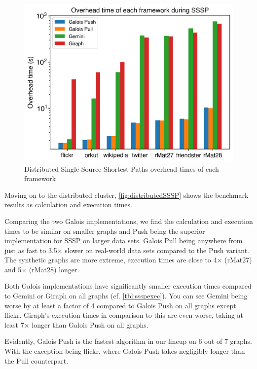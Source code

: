 \begin{figure}
	\centering
	\includegraphics[width=\linewidth]{../../plots/distributedSSSP_overheadTime.png}
	\caption{Distributed Single-Source Shortest-Paths overhead times of each framework}
	\label{fig:distributedSSSP_overhead}
\end{figure}

Moving on to the distributed cluster, \autoref{fig:distributedSSSP} shows the benchmark results as calculation and execution times. 

Comparing the two Galois implementations, we find the calculation and execution times to be similar on smaller graphs and Push being the superior implementation for SSSP on larger data sets. Galois Pull being anywhere from just as fast to 3.5$\times$ slower on real-world data sets compared to the Push variant. The synthetic graphs are more extreme, execution times are close to 4$\times$ (rMat27) and 5$\times$ (rMat28) longer.

Both Galois implementations have significantly smaller execution times compared to Gemini or Giraph on all graphs (cf. \autoref{tbl:ssspexec}).
You can see Gemini being worse by at least a factor of 4 compared to Galois Push on all graphs except flickr.
Giraph's execution times in comparison to this are even worse, taking at least 7$\times$ longer than Galois Push on all graphs.

Evidently, Galois Push is the fastest algorithm in our lineup on 6 out of 7 graphs. With the exception being flickr, where Galois Push takes negligibly longer than the Pull counterpart. 



